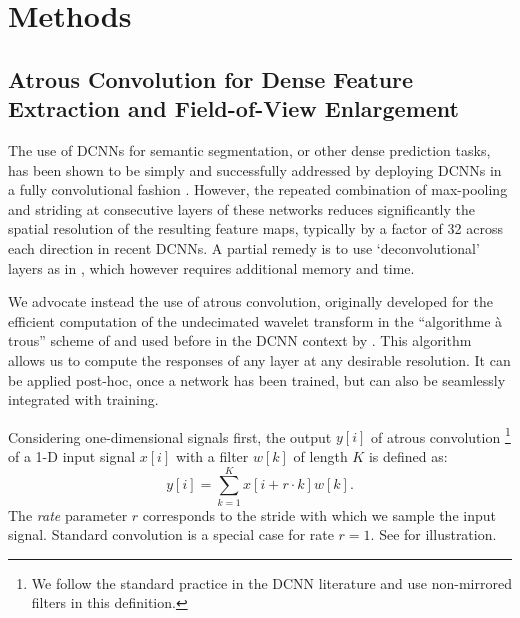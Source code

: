 \section{Methods}
\label{sec:methods}

\subsection{Atrous Convolution for Dense Feature Extraction and Field-of-View Enlargement}
\label{sec:convnet-hole}
The use of DCNNs for semantic segmentation, or other dense prediction tasks, has been shown to be
simply and successfully addressed by deploying DCNNs in a fully convolutional fashion \cite{sermanet2013overfeat, long2014fully}.
 However, the repeated combination of max-pooling and striding
 at consecutive layers of these networks reduces significantly the spatial resolution of the
 resulting feature maps, typically by a factor of 32 across each direction in recent DCNNs.
 A partial remedy is to use `deconvolutional' layers as  in  \cite{long2014fully},
which however requires additional memory and time.
 
We advocate instead the use of atrous convolution, originally developed for the efficient computation of the
undecimated wavelet transform in the ``algorithme \`a trous'' scheme of
\cite{holschneider1989real} and used before in the DCNN context by
\cite{giusti2013fast, sermanet2013overfeat, papandreou2014untangling}.
This algorithm allows us to compute the responses of any layer at any desirable resolution.
It can be applied post-hoc, once a network has been trained, but can also be seamlessly integrated with training.

Considering one-dimensional signals first, the output $y[i]$ of atrous convolution \footnote{We follow the
standard practice in the DCNN literature and use non-mirrored filters in this
definition.} of a 1-D input signal $x[i]$ with a filter $w[k]$ of length $K$ is
defined as:
\begin{equation}
  y[i] = \sum_{k=1}^K x[i + r \cdot k] w[k].
\end{equation}
The \emph{rate} parameter $r$ corresponds to the stride with which we sample the
input signal. Standard convolution is a special case for rate $r = 1$.
See  for illustration.

